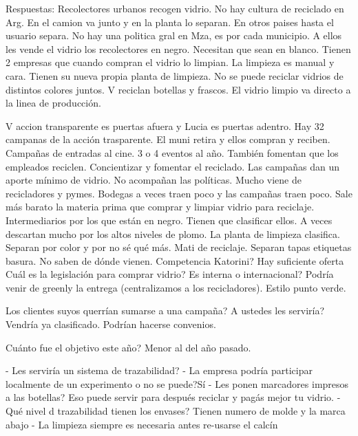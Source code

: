 Respuestas:
Recolectores urbanos recogen vidrio.
No hay cultura de reciclado en Arg.
En el camion va junto y en la planta lo separan.
En otros paises hasta el usuario separa.
No hay una politica gral en Mza, es por cada municipio.
A ellos les vende el vidrio los recolectores en negro. Necesitan que sean en blanco. Tienen 2 empresas que cuando compran el vidrio lo limpian. La limpieza es manual y cara. Tienen su nueva propia planta de limpieza.
No se puede reciclar vidrios de distintos colores juntos.
V reciclan botellas y frascos. 
El vidrio limpio va directo a la linea de producción.

V accion transparente es puertas afuera y Lucia es puertas adentro. Hay 32 campanas de la acción trasparente. El muni retira y ellos compran y reciben.
Campañas de entradas al cine.
3 o 4 eventos al año. 
También fomentan que los empleados reciclen.
Concientizar y fomentar el reciclado.
Las campañas dan un aporte mínimo de vidrio.
No acompañan las políticas. 
Mucho viene de recicladores y pymes. Bodegas a veces traen poco y las campañas traen poco.
Sale más barato la materia prima que comprar y limpiar vidrio para reciclaje.
Intermediarios por los que están en negro.
Tienen que clasificar ellos. A veces descartan mucho por los altos niveles de plomo.
La planta de limpieza clasifica. Separan por color y por no sé qué más. Mati de reciclaje. Separan tapas etiquetas basura. No saben de dónde vienen. Competencia Katorini? 
Hay suficiente oferta
Cuál es la legislación para comprar vidrio? Es interna o internacional? Podría venir de greenly la entrega (centralizamos a los recicladores). Estilo punto verde.

Los clientes suyos querrían sumarse a una campaña? A ustedes les serviría? Vendría ya clasificado. Podrían hacerse convenios.

Cuánto fue el objetivo este año? Menor al del año pasado.


- Les serviría un sistema de trazabilidad?
- La empresa podría participar localmente de un experimento o no se puede?Sí
- Les ponen marcadores impresos a las botellas? Eso puede servir para después reciclar y pagás mejor tu vidrio.
- Qué nivel d trazabilidad tienen los envases? Tienen numero de molde y la marca abajo
- La limpieza siempre es necesaria antes re-usarse el calcín
